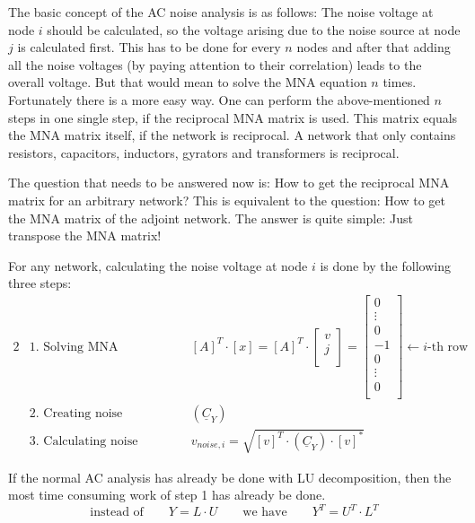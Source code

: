 \addvspace{12pt}

The basic concept of the AC noise analysis is as follows: The
noise voltage at node $i$ should be calculated, so the voltage arising
due to the noise source at node $j$ is calculated first. This has to
be done for every $n$ nodes and after that adding all the noise
voltages (by paying attention to their correlation) leads to the
overall voltage. But that would mean to solve the MNA equation $n$
times.  Fortunately there is a more easy way.  One can perform the
above-mentioned $n$ steps in one single step, if the reciprocal MNA
matrix is used. This matrix equals the MNA matrix itself, if the
network is reciprocal.  A network that only contains resistors,
capacitors, inductors, gyrators and transformers is reciprocal.

\addvspace{12pt}

The question that needs to be answered now is: How to get the
reciprocal MNA matrix for an arbitrary network? This is equivalent to
the question: How to get the MNA matrix of the adjoint network.
The answer is quite simple: Just transpose the MNA matrix!

\addvspace{12pt}

For any network, calculating the noise voltage at node $i$ is done by
the following three steps:
\begin{alignat}{2}
 & \textrm{1. Solving MNA equation:} & \qquad & \left[A\right]^T \cdot \left[x\right] =
\left[A\right]^T \cdot
\begin{bmatrix}
v \\
j \\
\end{bmatrix}
=
\begin{bmatrix}
0 \\
\vdots \\
0 \\
-1 \\
0 \\
\vdots \\
0 \\
\end{bmatrix}
\leftarrow i\textrm{-th row} \\
 & \textrm{2. Creating noise correlation matrix:} & \qquad
 & \left( \underline{C}_Y \right) \\
 & \textrm{3. Calculating noise voltage:} & \qquad
 & v_{noise,i} = \sqrt{\left[v\right]^T \cdot \left( \underline{C}_Y \right) \cdot \left[v\right]^*}
\end{alignat}

If the normal AC analysis has already be done with LU decomposition,
then the most time consuming work of step 1 has already be done.
\begin{equation}
\textrm{instead of} \qquad Y = L\cdot U \qquad \textrm{we have} \qquad
Y^T = U^T \cdot L^T
\end{equation}

